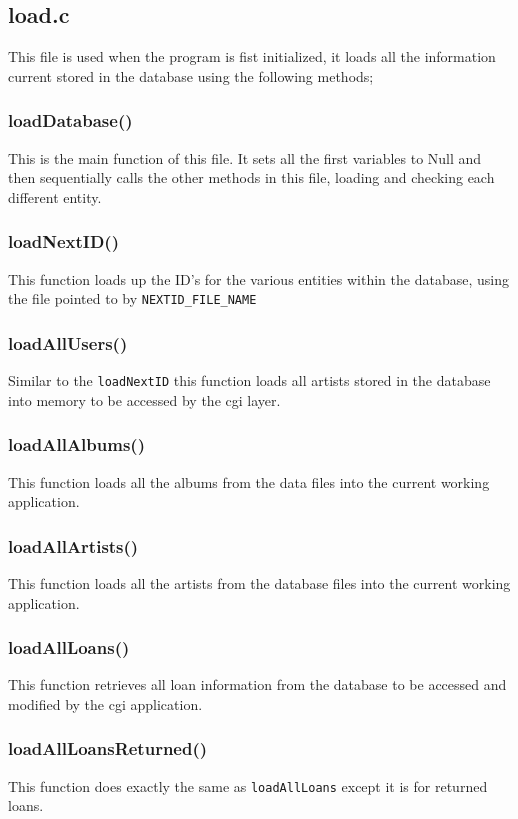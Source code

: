 \documentclass{article}
\begin{document}
\subsection{load.c}
This file is used when the program is fist initialized, it loads all the information current stored in the database using the following methods;

\subsubsection*{loadDatabase()}
This is the main function of this file. It sets all the first variables to Null
and then sequentially calls the other methods in this file, loading and checking each different entity.

\subsubsection*{loadNextID()}
This function loads up the ID's for the various entities within the database, using the file pointed to by \verb|NEXTID_FILE_NAME|

\subsubsection*{loadAllUsers()}
Similar to the \verb|loadNextID| this function loads all artists stored in the database into memory to be accessed by the cgi layer.

\subsubsection*{loadAllAlbums()}
This function loads all the albums from the data files into the current working application.

\subsubsection*{loadAllArtists()}
This function loads all the artists from the database files into the current working application.

\subsubsection*{loadAllLoans()}
\label{loan}
This function retrieves all loan information from the database to be accessed and modified by the cgi application.

\subsubsection*{loadAllLoansReturned()}
This function does exactly the same as \verb|loadAllLoans| except it is for returned loans.
\end{document}
